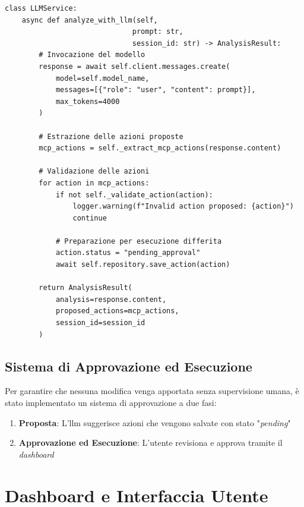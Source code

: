 \begin{listing}[H]
\begin{verbatim}
class LLMService:
    async def analyze_with_llm(self, 
                              prompt: str,
                              session_id: str) -> AnalysisResult:
        # Invocazione del modello
        response = await self.client.messages.create(
            model=self.model_name,
            messages=[{"role": "user", "content": prompt}],
            max_tokens=4000
        )
        
        # Estrazione delle azioni proposte
        mcp_actions = self._extract_mcp_actions(response.content)
        
        # Validazione delle azioni
        for action in mcp_actions:
            if not self._validate_action(action):
                logger.warning(f"Invalid action proposed: {action}")
                continue
                
            # Preparazione per esecuzione differita
            action.status = "pending_approval"
            await self.repository.save_action(action)
        
        return AnalysisResult(
            analysis=response.content,
            proposed_actions=mcp_actions,
            session_id=session_id
        )
\end{verbatim}
\caption{Parsing e validazione delle azioni MCP}
\label{listing:llm-action-parsing}
\end{listing}

\subsection{Sistema di Approvazione ed Esecuzione}
Per garantire che nessuna modifica venga apportata senza supervisione umana, è stato implementato un sistema di approvazione a due fasi:

\begin{enumerate}
    \item \textbf{Proposta}: L'\gls{llm} suggerisce azioni che vengono salvate con stato "\textit{pending}"
    \item \textbf{Approvazione ed Esecuzione}: L'utente revisiona e approva tramite il \textit{dashboard}
\end{enumerate}

\section{Dashboard e Interfaccia Utente}
\label{sec:frontend_implementation}


